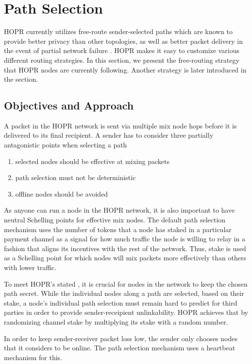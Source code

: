 \section{Path Selection}
\label{sec:path-selection}
HOPR currently utilizes free-route sender-selected paths which are known to provide better privacy than other topologies, as well as better packet delivery in the event of partial network failure \cite{Dingledine2004SynchronousBF}. HOPR makes it easy to customize various different routing strategies. In this section, we present the free-routing strategy that HOPR nodes are currently following. Another strategy is later introduced in the  section.

\subsection{Objectives and Approach}
A packet in the HOPR network is sent via multiple mix node hops before it is delivered to its final recipient. A sender has to consider three partially antagonistic points when selecting a path

\begin{enumerate}
    \item selected nodes should be effective at mixing packets
    \item path selection must not be deterministic
    \item offline nodes should be avoided
\end{enumerate}

As anyone can run a node in the HOPR network, it is also important to have neutral Schelling points for effective mix nodes. The default path selection mechanism uses the number of tokens that a node has staked in a particular payment channel as a signal for how much traffic the node is willing to relay in a fashion that aligns its incentives with the rest of the network. Thus, stake is used as a Schelling point for which nodes will mix packets more effectively than others with lower traffic.

To meet HOPR's stated , it is crucial for nodes in the network to keep the chosen path secret. While the individual nodes along a path are selected, based on their stake, a node's individual path selection must remain hard to predict for third parties in order to provide sender-receipient unlinkability. HOPR achieves that by randomizing channel stake by multiplying its stake with a random number.

In order to keep sender-receiver packet loss low, the sender only chooses nodes that it considers to be online. The path selection mechanism uses a heartbeat mechanism for this.



